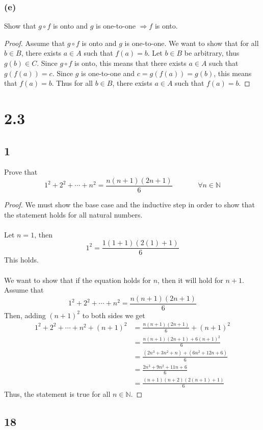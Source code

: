 \documentclass{article}
\begin{document}
\subsubsection*{(e)}
Show that $g \circ f$ is onto and $g$ is one-to-one $\Longrightarrow f$ is onto.
\begin{proof}
    Assume that $g \circ f$ is onto and $g$ is one-to-one.
    We want to show that for all $b \in B$, there exists $a \in A$ such that $f(a) = b$.
    Let $b \in B$ be arbitrary, thus $g(b) \in C$.
    Since $g \circ f$ is onto, this means that there exists $a \in A$ such that $g(f(a)) = c$.
    Since $g$ is one-to-one and $c = g(f(a)) = g(b)$, this means that $f(a) = b$.
    Thus for all $b \in B$, there exists $a \in A$ such that $f(a) = b$.
\end{proof}
\section*{2.3}
\subsection*{1}
Prove that
\[ 1^2 + 2^2 + \cdots + n^2 = \frac{n(n+1)(2n+1)}{6}  \ \ \ \ \ \ \ \  
\ \ \ \ \ \ \ \ \forall n \in \mathbb{N}\]
\begin{proof}
    We must show the base case and the inductive step in order to show that the statement holds for all natural numbers.
    \\\\
    Let $n = 1$, then
    \[ 1^2 = \frac{1(1+1)(2(1)+1)}{6} \]
    This holds.
    \\\\
    We want to show that if the equation holds for $n$, then it will hold for $n + 1$.
    Assume that \[ 1^2 + 2^2 + \cdots + n^2 = \dfrac{n(n+1)(2n+1)}{6} \]
    Then, adding $(n+1)^2$ to both sides we get
    \begin{align*}
        1^2 + 2^2 + \cdots + n^2 + (n+1)^2 & = \frac{n(n+1)(2n+1)}{6} + (n+1) ^2 \\
        & = \frac{n(n+1)(2n+1) + 6(n+1)^2}{6} \\
        & = \frac{(2n^3 + 3n^2 + n) + (6n^2 + 12n + 6)}{6} \\
        & = \frac{2n^3 + 9n^2 +11n + 6}{6} \\
        & = \frac{(n+1)(n+2)(2(n+1)+1)}{6}
    \end{align*}
    Thus, the statement is true for all $n \in \mathbb{N}$.
\end{proof}

\subsection*{18}
\end{document}

